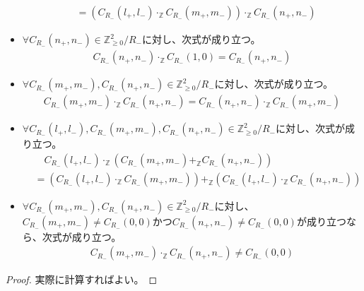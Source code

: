 \documentclass[dvipdfmx]{jsarticle}
\begin{document}
\begin{thm}
\begin{itemize}
\begin{align*}
&= \left( C_{R_{-}}\left( l_{+},l_{-} \right) \cdot_{\mathbb{Z}}C_{R_{-}}\left( m_{+},m_{-} \right) \right) \cdot_{\mathbb{Z}}C_{R_{-}}\left( n_{+},n_{-} \right)
\end{align*}
\item
  $\forall C_{R_{-}}\left( n_{+},n_{-} \right) \in \mathbb{Z}_{\geq 0}^{2} /R_{-} $に対し、次式が成り立つ。
\begin{align*}
C_{R_{-}}\left( n_{+},n_{-} \right) \cdot_{\mathbb{Z}}C_{R_{-}}(1,0) = C_{R_{-}}\left( n_{+},n_{-} \right)
\end{align*}
\item
  $\forall C_{R_{-}}\left( m_{+},m_{-} \right),C_{R_{-}}\left( n_{+},n_{-} \right) \in \mathbb{Z}_{\geq 0}^{2} /R_{-} $に対し、次式が成り立つ。
\begin{align*}
C_{R_{-}}\left( m_{+},m_{-} \right) \cdot_{\mathbb{Z}}C_{R_{-}}\left( n_{+},n_{-} \right) = C_{R_{-}}\left( n_{+},n_{-} \right) \cdot_{\mathbb{Z}}C_{R_{-}}\left( m_{+},m_{-} \right)
\end{align*}
\item
  $\forall C_{R_{-}}\left( l_{+},l_{-} \right),C_{R_{-}}\left( m_{+},m_{-} \right),C_{R_{-}}\left( n_{+},n_{-} \right) \in \mathbb{Z}_{\geq 0}^{2} /R_{-} $に対し、次式が成り立つ。
\begin{align*}
&\quad C_{R_{-}}\left( l_{+},l_{-} \right) \cdot_{\mathbb{Z}}\left( C_{R_{-}}\left( m_{+},m_{-} \right) +_{\mathbb{Z}}C_{R_{-}}\left( n_{+},n_{-} \right) \right) \\
&= \left( C_{R_{-}}\left( l_{+},l_{-} \right) \cdot_{\mathbb{Z}}C_{R_{-}}\left( m_{+},m_{-} \right) \right) +_{\mathbb{Z}}\left( C_{R_{-}}\left( l_{+},l_{-} \right) \cdot_{\mathbb{Z}}C_{R_{-}}\left( n_{+},n_{-} \right) \right)
\end{align*}
\item
  $\forall C_{R_{-}}\left( m_{+},m_{-} \right),C_{R_{-}}\left( n_{+},n_{-} \right) \in \mathbb{Z}_{\geq 0}^{2} /R_{-} $に対し、$C_{R_{-}}\left( m_{+},m_{-} \right) \neq C_{R_{-}}(0,0)$かつ$C_{R_{-}}\left( n_{+},n_{-} \right) \neq C_{R_{-}}(0,0)$が成り立つなら、次式が成り立つ。
\begin{align*}
C_{R_{-}}\left( m_{+},m_{-} \right) \cdot_{\mathbb{Z}}C_{R_{-}}\left( n_{+},n_{-} \right) \neq C_{R_{-}}(0,0)
\end{align*}
\end{itemize}
\end{thm}
\begin{proof}
実際に計算すればよい。
\end{proof}
\end{document}
